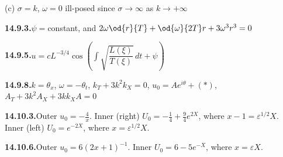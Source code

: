 \quad (c) $\sigma = k$, $\omega = 0$ ill-posed since $\sigma \to \infty$ as $k \to +\infty$

\medskip
\textbf{14.9.3.}\quad $\psi ={}$constant, and $2\omega\od{r}{T}+\od{\omega}{2T}r+3\omega^3 r^3 = 0$

\medskip
\textbf{14.9.5.}\quad $u = cL^{-3/4}\cos\!\left(\int\sqrt{\dfrac{L(\xi)}{T(\xi)}}\,dt + \psi\right)$%

\medskip
\textbf{14.9.8.}\quad $k = \theta_x$, $\omega = -\theta_t$, $k_T + 3k^2 k_X = 0$, $u_0 = Ae^{i\theta}+(*)$, $A_T + 3k^2 A_X + 3kk_X A = 0$

\medskip
\textbf{14.10.3.}\quad Outer $u_0 = -\frac{4}{x}$. Inner (right) $U_0 = -\frac{1}{4}+\frac{9}{4}e^{2X}$, where $x - 1 = \varepsilon^{1/2}X$.
Inner (left) $U_0 = e^{-2X}$, where $x = \varepsilon^{1/2}X$.

\medskip
\textbf{14.10.6.}\quad Outer $u_0 = 6(2x+1)^{-1}$. Inner $U_0 = 6-5e^{-X}$, where $x = \varepsilon X$.
